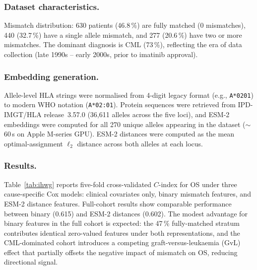 \documentclass[11pt,a4paper]{article}
\begin{document}
\subsubsection*{Dataset characteristics.}
Mismatch distribution: 630 patients (46.8\,\%) are fully matched (0
mismatches), 440 (32.7\,\%) have a single allele mismatch, and 277 (20.6\,\%)
have two or more mismatches.  The dominant diagnosis is CML (73\,\%), reflecting
the era of data collection (late 1990s -- early 2000s, prior to imatinib
approval).

\subsubsection*{Embedding generation.}
Allele-level HLA strings were normalised from 4-digit legacy format
(e.g., \texttt{A*0201}) to modern WHO notation (\texttt{A*02:01}).
Protein sequences were retrieved from IPD-IMGT/HLA release~3.57.0
(36{,}611 alleles across the five loci), and ESM-2 embeddings were computed
for all 270 unique alleles appearing in the dataset ($\sim$60\,s on Apple
M-series GPU).  ESM-2 distances were computed as the mean optimal-assignment
$\ell_2$ distance across both alleles at each locus.

\subsubsection*{Results.}
Table~\ref{tab:ihwg} reports five-fold cross-validated $C$-index for OS under
three cause-specific Cox models: clinical covariates only, binary mismatch
features, and ESM-2 distance features.  Full-cohort results show comparable
performance between binary (0.615) and ESM-2 distances (0.602).  The modest
advantage for binary features in the full cohort is expected: the 47\,\%
fully-matched stratum contributes identical zero-valued features under both
representations, and the CML-dominated cohort introduces a competing
graft-versus-leukaemia (GvL) effect that partially offsets the negative
impact of mismatch on OS, reducing directional signal.
\end{document}
